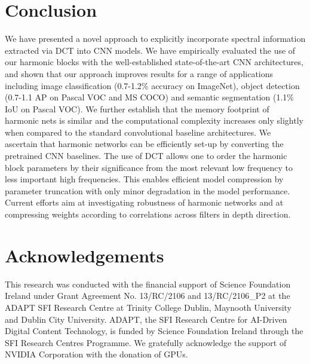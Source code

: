\documentclass[12pt,a4paper]{article}
\begin{document}
\section{Conclusion} \label{sec:conclusion}

We have presented a novel approach to explicitly incorporate spectral information extracted via DCT into CNN models. 
We have empirically evaluated the use of our harmonic blocks with the well-established state-of-the-art CNN architectures, and shown that our approach  improves results for a range of applications including image classification (0.7-1.2\% accuracy on ImageNet), object detection (0.7-1.1 AP on Pascal VOC and MS COCO) and semantic segmentation (1.1\% IoU on Pascal VOC).
We further establish that the memory footprint of harmonic nets is similar and the computational complexity increases only slightly when compared to the standard convolutional baseline architectures.
We ascertain that harmonic networks can be efficiently set-up by converting the pretrained CNN baselines. 
The use of DCT allows one to order the harmonic block parameters by their significance from the most relevant low frequency to less important high frequencies. This enables efficient model compression by parameter truncation with only minor degradation in the model performance. Current efforts aim at investigating robustness of harmonic networks and at compressing weights according to correlations across filters in depth direction.


\section*{Acknowledgements}
This research was conducted with the financial support of Science Foundation Ireland under Grant Agreement No. 13/RC/2106 and 13/RC/2106\_P2 at the ADAPT SFI Research Centre at Trinity College Dublin, Maynooth University and Dublin City University. ADAPT, the SFI Research Centre for AI-Driven Digital Content Technology, is funded by Science Foundation Ireland through the SFI Research Centres Programme.
We gratefully acknowledge the support of NVIDIA Corporation with the donation of GPUs.


\end{document}
